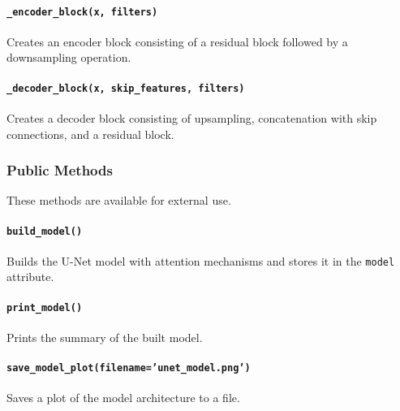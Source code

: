 \documentclass{article}
\begin{document}
	\paragraph*{\texttt{\_encoder\_block(x, filters)}}
	Creates an encoder block consisting of a residual block followed by a downsampling operation.
	
	\paragraph*{\texttt{\_decoder\_block(x, skip\_features, filters)}}
	Creates a decoder block consisting of upsampling, concatenation with skip connections, and a residual block.
	
	\subsubsection*{Public Methods}
	These methods are available for external use.
	
	\paragraph*{\texttt{build\_model()}}
	Builds the U-Net model with attention mechanisms and stores it in the \texttt{model} attribute.
	
	\paragraph*{\texttt{print\_model()}}
	Prints the summary of the built model.
	
	\paragraph*{\texttt{save\_model\_plot(filename='unet\_model.png')}}
	Saves a plot of the model architecture to a file.
	
\end{document}
